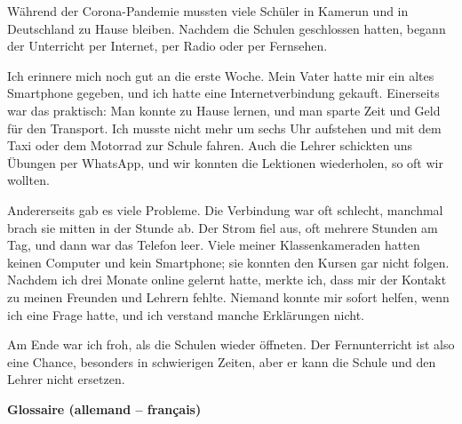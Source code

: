 \documentclass[11pt]{article}
\begin{document}
\begin{textebox}
Während der Corona-Pandemie mussten viele Schüler in Kamerun und in Deutschland zu Hause bleiben. Nachdem die Schulen geschlossen hatten, begann der Unterricht per Internet, per Radio oder per Fernsehen.

Ich erinnere mich noch gut an die erste Woche. Mein Vater hatte mir ein altes Smartphone gegeben, und ich hatte eine Internetverbindung gekauft. Einerseits war das praktisch: Man konnte zu Hause lernen, und man sparte Zeit und Geld für den Transport. Ich musste nicht mehr um sechs Uhr aufstehen und mit dem Taxi oder dem Motorrad zur Schule fahren. Auch die Lehrer schickten uns Übungen per WhatsApp, und wir konnten die Lektionen wiederholen, so oft wir wollten.

Andererseits gab es viele Probleme. Die Verbindung war oft schlecht, manchmal brach sie mitten in der Stunde ab. Der Strom fiel aus, oft mehrere Stunden am Tag, und dann war das Telefon leer. Viele meiner Klassenkameraden hatten keinen Computer und kein Smartphone; sie konnten den Kursen gar nicht folgen. Nachdem ich drei Monate online gelernt hatte, merkte ich, dass mir der Kontakt zu meinen Freunden und Lehrern fehlte. Niemand konnte mir sofort helfen, wenn ich eine Frage hatte, und ich verstand manche Erklärungen nicht.

Am Ende war ich froh, als die Schulen wieder öffneten. Der Fernunterricht ist also eine Chance, besonders in schwierigen Zeiten, aber er kann die Schule und den Lehrer nicht ersetzen.
\end{textebox}

\textbf{Glossaire (allemand -- français)}
\end{document}
